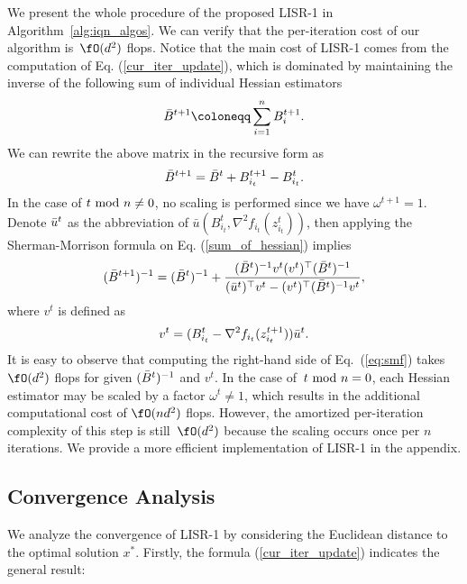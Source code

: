 We present the whole procedure of the proposed LISR-1 in Algorithm~\ref{alg:iqn_algos}.
We can verify that the per-iteration cost of our algorithm is~$\fO(d^2)$ flops.
Notice that the main cost of LISR-1 comes from the computation of Eq. (\ref{cur_iter_update}), which is dominated by maintaining the inverse of the following sum of individual Hessian estimators
\begin{equation*}
    \Bar{B}^{t+1} \coloneqq \sum_{i=1}^n B_i^{t+1}.
\end{equation*}
We can rewrite the above matrix in the recursive form as
\begin{equation}\label{sum_of_hessian}
\Bar{B}^{t+1} = \Bar{B}^{t} + B_{i_t}^{t+1} - B_{i_t}^{t}.
\end{equation}
In the case of $t~{\rm mod}~n \neq 0$, no scaling is performed since we have $\omega^{t+1}=1$. Denote $\Bar{u}^t$ as the abbreviation of $\bar{u}(B_{i_t}^t, \nabla^2 f_{i_t}(z_{i_t}^t))$, then applying the Sherman-Morrison formula on Eq. (\ref{sum_of_hessian}) implies
\begin{equation}\label{eq:smf}
    (\Bar{B}^{t+1})^{-1} = (\Bar{B}^{t})^{-1} + \frac{(\Bar{B}^{t})^{-1}v^{t}(v^{t})^{\top}(\Bar{B}^{t})^{-1}}{(\bar{u}^t)^{\top} v^{t} - (v^{t})^{\top} (\Bar{B}^{t})^{-1} v^{t}},
\end{equation}
where $v^{t}$ is defined as
\begin{equation*}
    v^{t} = (B_{i_{t}}^{t} - \nabla^2 f_{i_{t}} (z_{i_{t}}^{t+1})) \Bar{u}^t.
\end{equation*}
It is easy to observe that computing the right-hand side of Eq.~(\ref{eq:smf}) takes $\fO(d^2)$ flops for given $(\Bar B^t)^{-1}$ and $v^t$.
In the case of~$t~{\rm mod}~n = 0$, each Hessian estimator may be scaled by a factor $\omega^t\neq 1$, which results in the additional computational cost of $\fO(n d^2)$ flops. However, the amortized per-iteration complexity of this step is still~$\fO(d^2)$ because the scaling occurs once per $n$ iterations.
We provide a more efficient implementation of LISR-1 in the appendix.

\subsection{Convergence Analysis} 

We analyze the convergence of LISR-1 by considering the Euclidean distance to the optimal solution $x^*$.
Firstly, the formula (\ref{cur_iter_update}) indicates the general result:

